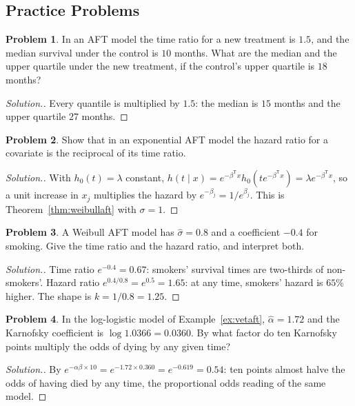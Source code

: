 \documentclass[11pt,a4paper]{article}
\numberwithin{equation}{section}
\theoremstyle{definition}
\newtheorem{problemx}{Problem}[subsection]
\newenvironment{problem}{\begin{problemx}}{\end{problemx}}
\newenvironment{solution}
  {\renewcommand{\qedsymbol}{}\begin{proof}[\textit{Solution}.]}
  {\end{proof}}
\begin{document}
\subsection{Practice Problems}

\begin{problem}
In an AFT model the time ratio for a new treatment is $1.5$, and the median survival under the control is $10$ months. What are the median and the upper quartile under the new treatment, if the control's upper quartile is $18$ months?
\end{problem}

\begin{solution}
Every quantile is multiplied by $1.5$: the median is $15$ months and the upper quartile $27$ months.
\end{solution}

\begin{problem}
Show that in an exponential AFT model the hazard ratio for a covariate is the reciprocal of its time ratio.
\end{problem}

\begin{solution}
With $h_0(t) = \lambda$ constant, $h(t \mid x) = e^{-\beta^{\mathsf T}x}h_0(te^{-\beta^{\mathsf T}x}) = \lambda e^{-\beta^{\mathsf T}x}$, so a unit increase in $x_j$ multiplies the hazard by $e^{-\beta_j} = 1/e^{\beta_j}$. This is Theorem~\ref{thm:weibullaft} with $\sigma = 1$.
\end{solution}

\begin{problem}
A Weibull AFT model has $\hat\sigma = 0.8$ and a coefficient $-0.4$ for smoking. Give the time ratio and the hazard ratio, and interpret both.
\end{problem}

\begin{solution}
Time ratio $e^{-0.4} = 0.67$: smokers' survival times are two-thirds of non-smokers'. Hazard ratio $e^{0.4/0.8} = e^{0.5} = 1.65$: at any time, smokers' hazard is $65\%$ higher. The shape is $k = 1/0.8 = 1.25$.
\end{solution}

\begin{problem}
In the log-logistic model of Example~\ref{ex:vetaft}, $\hat\alpha = 1.72$ and the Karnofsky coefficient is $\log 1.0366 = 0.0360$. By what factor do ten Karnofsky points multiply the odds of dying by any given time?
\end{problem}

\begin{solution}
By $e^{-\alpha\beta \times 10} = e^{-1.72 \times 0.360} = e^{-0.619} = 0.54$: ten points almost halve the odds of having died by any time, the proportional odds reading of the same model.
\end{solution}
\end{document}
